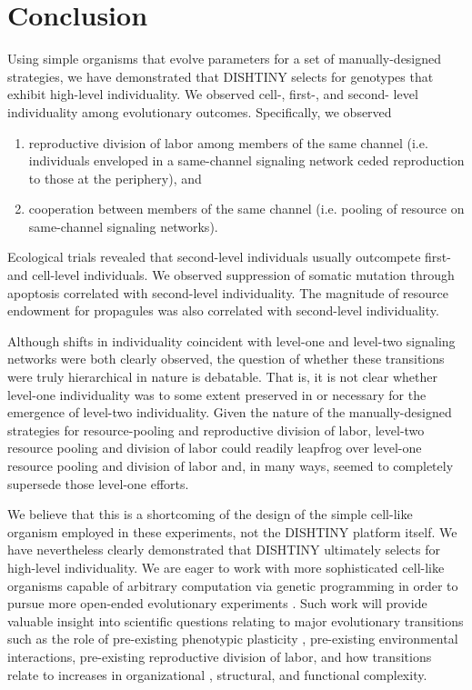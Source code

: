 \section{Conclusion}

Using simple organisms that evolve parameters for a set of manually-designed strategies, we have demonstrated that DISHTINY selects for genotypes that exhibit high-level individuality.
We observed cell-, first-, and second- level individuality among evolutionary outcomes.
Specifically, we observed
\begin{enumerate}
  \item reproductive division of labor among members of the same channel (i.e. individuals enveloped in a same-channel signaling network ceded reproduction to those at the periphery), and
  \item cooperation between members of the same channel (i.e. pooling of resource on same-channel signaling networks).
\end{enumerate}

Ecological trials revealed that second-level individuals usually outcompete first- and cell-level individuals.
We observed suppression of somatic mutation through apoptosis correlated with second-level individuality.
The magnitude of resource endowment for propagules was also correlated with second-level individuality.

Although shifts in individuality coincident with level-one and level-two signaling networks were both clearly observed, the question of whether these transitions were truly hierarchical in nature is debatable.
That is, it is not clear whether level-one individuality was to some extent preserved in or necessary for the emergence of level-two individuality.
Given the nature of the manually-designed strategies for resource-pooling and reproductive division of labor, level-two resource pooling and division of labor could readily leapfrog over level-one resource pooling and division of labor and, in many ways, seemed to completely supersede those level-one efforts.

We believe that this is a shortcoming of the design of the simple cell-like organism employed in these experiments, not the DISHTINY platform itself.
We have nevertheless clearly demonstrated that DISHTINY ultimately selects for high-level individuality.
We are eager to work with more sophisticated cell-like organisms capable of arbitrary computation via genetic programming in order to pursue more open-ended evolutionary experiments \cite{ofria2004avida}.
Such work will provide valuable insight into scientific questions relating to major evolutionary transitions such as the role of pre-existing phenotypic plasticity \citep{clune2007investigating, lalejini2016evolutionary}, pre-existing environmental interactions, pre-existing reproductive division of labor, and how transitions relate to increases in organizational \citep{goldsby2012task}, structural, and functional \citep{goldsby2014evolutionary} complexity.

